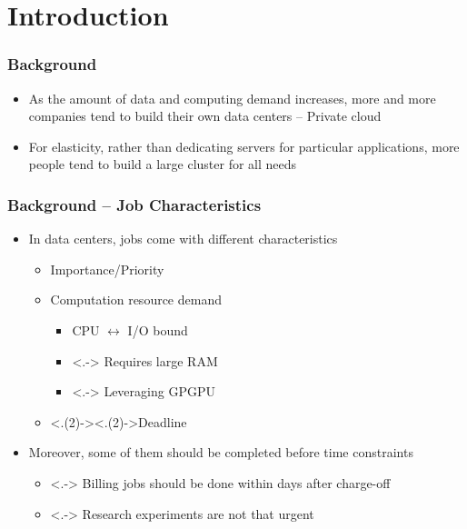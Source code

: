 \section{Introduction}

\begin{frame}
  \frametitle{Background}
  \begin{itemize}[<+->]
    \item As the amount of data and computing demand increases, more and
      more companies tend to build their own data centers -- Private cloud
    \item For elasticity, rather than dedicating servers for particular
      applications, more people tend to build a large cluster for all
      needs
  \end{itemize}
\end{frame}

\begin{frame}
  \frametitle{Background -- Job Characteristics}
  \begin{itemize}[<+->]
    \item In data centers, jobs come with different characteristics
      \begin{itemize}
        \item Importance/Priority
        \item Computation resource demand
          \begin{itemize}
            \item CPU $\leftrightarrow$ I/O bound
            \item <.-> Requires large RAM
            \item <.-> Leveraging GPGPU
          \end{itemize}
        \item <.(2)->{\alert<.(2)->{Deadline}}
      \end{itemize}
    \item Moreover, some of them should be completed before time
      constraints
      \begin{itemize}
        \item <.-> Billing jobs should be done within days after charge-off
        \item <.-> Research experiments are not that urgent
      \end{itemize}
  \end{itemize}
\end{frame}

